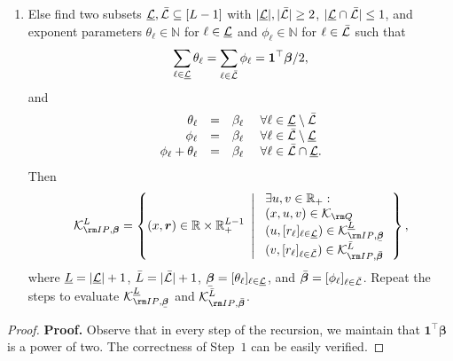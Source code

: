 \documentclass[opre, nonblindrev]{informswp}
\newcommand{\1}[1]{\mathds{1}{\left(#1\right)}}
\begin{document}
\begin{appendices}
\begin{theorem}
\begin{enumerate}[Step 1.]
\item Else find two subsets $\underline {\mathcal{L}}, \bar {\mathcal{L}}  \subseteq [L-1]$ with $|\underline {\mathcal{L}}|, |\bar {\mathcal{L}}| \geq 2$, $|\underline {\mathcal{L}} \cap \bar {\mathcal{L}}| \leq 1$, and exponent parameters $\theta_\ell \in \mathbb{N}$ for $\ell \in \underline {\mathcal{L}}$ and $\phi_\ell \in \mathbb{N}$ for $\ell \in \bar {\mathcal{L}}$ such that 
$$
\sum_{\ell \in \underline {\mathcal{L}}} \theta_\ell = \sum_{\ell \in \bar{\mathcal{L}}} \phi_\ell = \bm 1^\top \bm \beta/2,
$$
and
$$
\begin{array}{rcll} 
\theta_\ell &=& \beta_\ell &~\forall \ell \in \underline {\mathcal{L}} \setminus \bar {\mathcal{L}} \\
\phi_\ell &=& \beta_\ell &~\forall \ell \in \bar {\mathcal{L}} \setminus \underline  {\mathcal{L}} \\
\phi_\ell + \theta_\ell &=& \beta_\ell &~\forall \ell \in \bar {\mathcal{L}} \cap  \underline  {\mathcal{L}}.
\end{array}
$$
Then 
$$
\cK^{L}_{{\rm IP},\bm \beta} = \left\{ (x,\bm r) \in \bbr\times \bbr^{L-1}_+ ~\left|~ 
\begin{array}{ll} \exists u,  v \in \bbr_+: \\
(x,u,v) \in \cK_{{\rm Q}} \\
(u, [r_\ell]_{\ell \in \underline \cL}) \in \cK^{\underline L}_{{\rm IP},\bmu \beta} \\
(v, [r_\ell]_{\ell \in \bar \cL}) \in \cK^{\bar L}_{{\rm IP},{\bmb \beta}} \\
\end{array}
\right.\right\},
$$
where $\underline L = | \underline {\mathcal{L}}|+1$, $\bar L = | \bar {\mathcal{L}}|+1$, $\bmu \beta = [\theta_\ell]_{\ell \in \underline \cL}$, and $\bar{\bm{\beta}} = [\phi_\ell]_{\ell \in \bar {\mathcal{L}}}$. Repeat the steps to evaluate $ \cK^{\underline L}_{{\rm IP},\bmu \beta}$ and $\cK^{\bar L}_{{\rm IP},{\bmb \beta}}$.
\end{enumerate}
\end{theorem}
\begin{proof}{\bf Proof.}
Observe that in every step of the recursion, we maintain that $\bm 1^\top \bm \beta$ is a power of two. The correctness of Step~$1$ can be easily verified. 


\end{proof}
\end{appendices}
\end{document}
